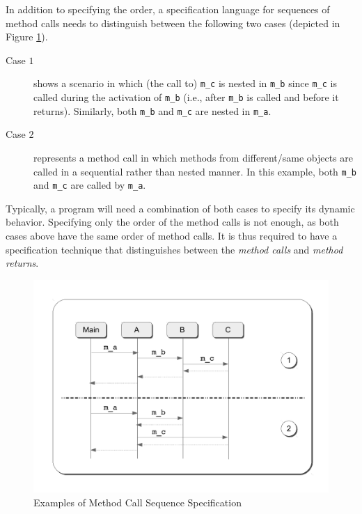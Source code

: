 In addition to specifying the order, a specification language for sequences of method calls
needs to distinguish between the following two cases (depicted in
Figure \ref{ch05:fig:seq-spec}).
\begin{description}
  \item[Case $1$] 
  shows a scenario in which (the call to) \texttt{m\_c} is nested in 
  \texttt{m\_b} since \texttt{m\_c} is called during the activation of 
  \texttt{m\_b} (i.e., after \texttt{m\_b} is called and before it returns). 
  Similarly, both \texttt{m\_b} and \texttt{m\_c} are nested in \texttt{m\_a}.
  
  
  \item[Case $2$] represents a method call in which methods from
  different/same objects are called in a sequential rather than nested
  manner. In this example, both \texttt{m\_b} and \texttt{m\_c} are called by
  \texttt{m\_a}.
\end{description}
Typically, a program will need a combination of both cases to specify its dynamic behavior.
Specifying only the order of the method calls is not enough, as both cases above
have the same order of method calls. It is thus required to have a specification
technique that distinguishes between the \textsl{method calls} and
\textsl{method returns}. \begin{figure}[h]
\begin{center}
  \includegraphics[scale=0.4]{images/seq-spec}
  \caption{Examples of Method Call Sequence Specification}
  \label{ch05:fig:seq-spec}
\end{center}
\end{figure}

